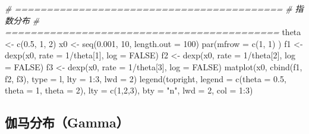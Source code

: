 \documentclass[
]{book}
\newenvironment{Shaded}{\begin{snugshade}}{\end{snugshade}}
\newcommand{\AttributeTok}[1]{\textcolor[rgb]{0.77,0.63,0.00}{#1}}
\newcommand{\CommentTok}[1]{\textcolor[rgb]{0.56,0.35,0.01}{\textit{#1}}}
\newcommand{\ConstantTok}[1]{\textcolor[rgb]{0.00,0.00,0.00}{#1}}
\newcommand{\DecValTok}[1]{\textcolor[rgb]{0.00,0.00,0.81}{#1}}
\newcommand{\FloatTok}[1]{\textcolor[rgb]{0.00,0.00,0.81}{#1}}
\newcommand{\FunctionTok}[1]{\textcolor[rgb]{0.00,0.00,0.00}{#1}}
\newcommand{\NormalTok}[1]{#1}
\newcommand{\OtherTok}[1]{\textcolor[rgb]{0.56,0.35,0.01}{#1}}
\newcommand{\SpecialCharTok}[1]{\textcolor[rgb]{0.00,0.00,0.00}{#1}}
\newcommand{\StringTok}[1]{\textcolor[rgb]{0.31,0.60,0.02}{#1}}
\begin{document}
\begin{Shaded}
\begin{Highlighting}[]
\CommentTok{\# ==========================================}
\CommentTok{\# 指数分布}
\CommentTok{\# ===========================================}
\NormalTok{theta }\OtherTok{\textless{}{-}} \FunctionTok{c}\NormalTok{(}\FloatTok{0.5}\NormalTok{, }\DecValTok{1}\NormalTok{, }\DecValTok{2}\NormalTok{)}
\NormalTok{x0 }\OtherTok{\textless{}{-}} \FunctionTok{seq}\NormalTok{(}\FloatTok{0.001}\NormalTok{, }\DecValTok{10}\NormalTok{, }\AttributeTok{length.out =} \DecValTok{100}\NormalTok{)}
\FunctionTok{par}\NormalTok{(}\AttributeTok{mfrow =} \FunctionTok{c}\NormalTok{(}\DecValTok{1}\NormalTok{, }\DecValTok{1}\NormalTok{) )}
\NormalTok{f1 }\OtherTok{\textless{}{-}} \FunctionTok{dexp}\NormalTok{(x0, }\AttributeTok{rate =} \DecValTok{1}\SpecialCharTok{/}\NormalTok{theta[}\DecValTok{1}\NormalTok{], }\AttributeTok{log =} \ConstantTok{FALSE}\NormalTok{)}
\NormalTok{f2 }\OtherTok{\textless{}{-}} \FunctionTok{dexp}\NormalTok{(x0, }\AttributeTok{rate =} \DecValTok{1}\SpecialCharTok{/}\NormalTok{theta[}\DecValTok{2}\NormalTok{], }\AttributeTok{log =} \ConstantTok{FALSE}\NormalTok{)}
\NormalTok{f3 }\OtherTok{\textless{}{-}} \FunctionTok{dexp}\NormalTok{(x0, }\AttributeTok{rate =} \DecValTok{1}\SpecialCharTok{/}\NormalTok{theta[}\DecValTok{3}\NormalTok{], }\AttributeTok{log =} \ConstantTok{FALSE}\NormalTok{)}
\FunctionTok{matplot}\NormalTok{(x0, }\FunctionTok{cbind}\NormalTok{(f1, f2, f3), }\AttributeTok{type =} \StringTok{\textquotesingle{}l\textquotesingle{}}\NormalTok{, }\AttributeTok{lty =} \DecValTok{1}\SpecialCharTok{:}\DecValTok{3}\NormalTok{, }\AttributeTok{lwd =} \DecValTok{2}\NormalTok{)}
\FunctionTok{legend}\NormalTok{(}\StringTok{\textquotesingle{}topright\textquotesingle{}}\NormalTok{, }
       \AttributeTok{legend =} \FunctionTok{c}\NormalTok{(}\StringTok{\textquotesingle{}theta = 0.5\textquotesingle{}}\NormalTok{, }\StringTok{\textquotesingle{}theta = 1\textquotesingle{}}\NormalTok{, }\StringTok{\textquotesingle{}theta = 2\textquotesingle{}}\NormalTok{),}
       \AttributeTok{lty =} \FunctionTok{c}\NormalTok{(}\DecValTok{1}\NormalTok{,}\DecValTok{2}\NormalTok{,}\DecValTok{3}\NormalTok{),}
       \AttributeTok{bty =} \StringTok{"n"}\NormalTok{, }\AttributeTok{lwd =} \DecValTok{2}\NormalTok{,  }\AttributeTok{col =} \DecValTok{1}\SpecialCharTok{:}\DecValTok{3}\NormalTok{)}
\end{Highlighting}
\end{Shaded}

\hypertarget{ux4f3dux9a6cux5206ux5e03gamma}{%
\subsection{伽马分布（Gamma）}\label{ux4f3dux9a6cux5206ux5e03gamma}}
\end{document}
